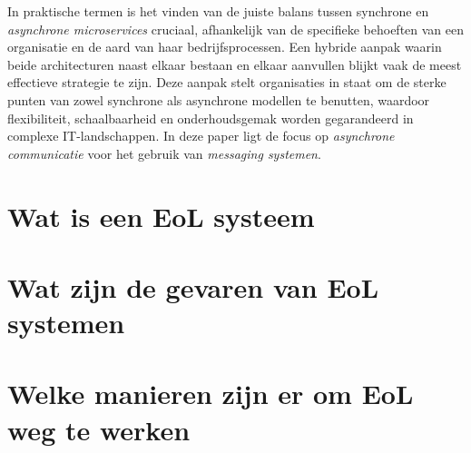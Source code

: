 In praktische termen is het vinden van de juiste balans tussen synchrone en \emph{asynchrone microservices} cruciaal, 
afhankelijk van de specifieke behoeften van een organisatie en de aard van haar bedrijfsprocessen. 
Een hybride aanpak waarin beide architecturen naast elkaar bestaan en elkaar aanvullen blijkt vaak de meest effectieve strategie te zijn. 
Deze aanpak stelt organisaties in staat om de sterke punten van zowel synchrone als asynchrone modellen te benutten, 
waardoor flexibiliteit, schaalbaarheid en onderhoudsgemak worden gegarandeerd in complexe \newline IT-landschappen.
In deze paper ligt de focus op \emph{asynchrone communicatie} voor het gebruik van \emph{messaging systemen}.
\newline
 

\section{Wat is een EoL systeem}

\section{Wat zijn de gevaren van EoL systemen}

\section{Welke manieren zijn er om EoL weg te werken}



